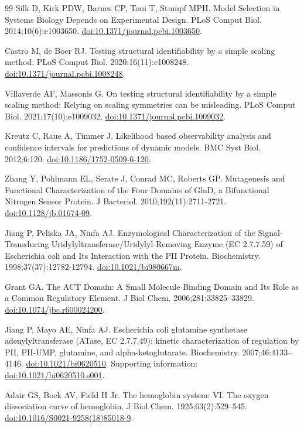 \documentclass[10pt,letterpaper]{article}
\begin{document}
\begin{thebibliography}{99}
Silk D, Kirk PDW, Barnes CP, Toni T, Stumpf MPH. Model Selection in Systems Biology Depends on Experimental Design. PLoS Comput Biol. 2014;10(6):e1003650. \href{https://doi.org/10.1371/journal.pcbi.1003650}{doi:10.1371/journal.pcbi.1003650}.

Castro M, de Boer RJ. Testing structural identifiability by a simple scaling method. PLoS Comput Biol. 2020;16(11):e1008248. \href{https://doi.org/10.1371/journal.pcbi.1008248}{doi:10.1371/journal.pcbi.1008248}.

Villaverde AF, Massonis G. On testing structural identifiability by a simple scaling method: Relying on scaling symmetries can be misleading. PLoS Comput Biol. 2021;17(10):e1009032. \href{https://doi.org/10.1371/journal.pcbi.1009032}{doi:10.1371/journal.pcbi.1009032}.

Kreutz C, Raue A, Timmer J. Likelihood based observability analysis and confidence intervals for predictions of dynamic models. BMC Syst Biol. 2012;6:120. \href{https://doi.org/10.1186/1752-0509-6-120}{doi:10.1186/1752-0509-6-120}.

Zhang Y, Pohlmann EL, Serate J, Conrad MC, Roberts GP. Mutagenesis and Functional Characterization of the Four Domains of GlnD, a Bifunctional Nitrogen Sensor Protein. J Bacteriol. 2010;192(11):2711-2721. \href{https://doi.org/10.1128/jb.01674-09}{doi:10.1128/jb.01674-09}.

Jiang P, Peliska JA, Ninfa AJ. Enzymological Characterization of the Signal-Transducing Uridylyltransferase/Uridylyl-Removing Enzyme (EC 2.7.7.59) of Escherichia coli and Its Interaction with the PII Protein. Biochemistry. 1998;37(37):12782-12794. \href{https://doi.org/10.1021/bi980667m}{doi:10.1021/bi980667m}.

Grant GA. The ACT Domain: A Small Molecule Binding Domain and Its Role as a Common Regulatory Element. J Biol Chem. 2006;281:33825--33829. \href{https://doi.org/10.1074/jbc.r600024200}{doi:10.1074/jbc.r600024200}.

Jiang P, Mayo AE, Ninfa AJ. Escherichia coli glutamine synthetase adenylyltransferase (ATase, EC 2.7.7.49): kinetic characterization of regulation by PII, PII-UMP, glutamine, and alpha-ketoglutarate. Biochemistry. 2007;46:4133--4146. \href{https://doi.org/10.1021/bi0620510}{doi:10.1021/bi0620510}. Supporting information: \href{https://doi.org/10.1021/bi0620510.s001}{doi:10.1021/bi0620510.s001}.

Adair GS, Bock AV, Field H Jr. The hemoglobin system: VI. The oxygen dissociation curve of hemoglobin. J Biol Chem. 1925;63(2):529--545. \href{https://doi.org/10.1016/S0021-9258(18)85018-9}{doi:10.1016/S0021-9258(18)85018-9}.


\end{thebibliography}
\end{document}
